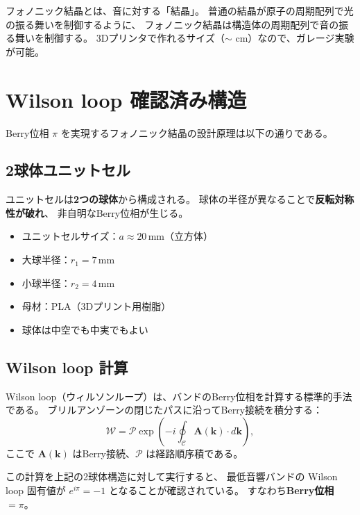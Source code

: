 \begin{hsbox}
フォノニック結晶とは、音に対する「結晶」。
普通の結晶が原子の周期配列で光の振る舞いを制御するように、
フォノニック結晶は構造体の周期配列で音の振る舞いを制御する。
3Dプリンタで作れるサイズ（$\sim$ cm）なので、ガレージ実験が可能。
\end{hsbox}

\section{Wilson loop 確認済み構造}
\label{sec:14.2}

Berry位相 $\pi$ を実現するフォノニック結晶の設計原理は以下の通りである。

\subsection{2球体ユニットセル}

ユニットセルは\textbf{2つの球体}から構成される。
球体の半径が異なることで\textbf{反転対称性が破れ}、
非自明なBerry位相が生じる。

\begin{dfnbox}[設計パラメータ]
\begin{itemize}
  \item ユニットセルサイズ：$a \approx 20$\,mm（立方体）
  \item 大球半径：$r_1 = 7$\,mm
  \item 小球半径：$r_2 = 4$\,mm
  \item 母材：PLA（3Dプリント用樹脂）
  \item 球体は中空でも中実でもよい
\end{itemize}
\end{dfnbox}

\subsection{Wilson loop 計算}

Wilson loop（ウィルソンループ）は、バンドのBerry位相を計算する標準的手法である。
ブリルアンゾーンの閉じたパスに沿ってBerry接続を積分する：
\[
  \mathcal{W} = \mathcal{P}\exp\left(-i\oint_{\mathcal{C}} \mathbf{A}(\mathbf{k})\cdot d\mathbf{k}\right),
\]
ここで $\mathbf{A}(\mathbf{k})$ はBerry接続、$\mathcal{P}$ は経路順序積である。

この計算を上記の2球体構造に対して実行すると、
最低音響バンドの Wilson loop 固有値が $e^{i\pi} = -1$ となることが確認されている。
すなわち\textbf{Berry位相 $= \pi$}。

